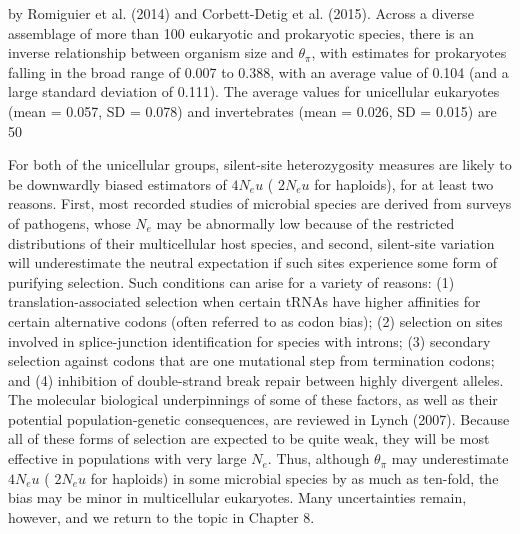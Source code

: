 \documentclass{article}
\begin{document}
by Romiguier et al. (2014) and Corbett-Detig et al. (2015). Across a diverse assemblage of more than 100 eukaryotic and prokaryotic species, there is an inverse relationship between organism size and  $ \theta_{\pi} $, with estimates for prokaryotes falling in the broad range of 0.007 to 0.388, with an average value of 0.104 (and a large standard deviation of 0.111). The average values for unicellular eukaryotes (mean = 0.057, SD = 0.078) and invertebrates (mean = 0.026, SD = 0.015) are 50%

For both of the unicellular groups, silent-site heterozygosity measures are likely to be downwardly biased estimators of  $ 4N_{e}u $ ( $ 2N_{e}u $ for haploids), for at least two reasons. First, most recorded studies of microbial species are derived from surveys of pathogens, whose  $ N_{e} $ may be abnormally low because of the restricted distributions of their multicellular host species, and second, silent-site variation will underestimate the neutral expectation if such sites experience some form of purifying selection. Such conditions can arise for a variety of reasons: (1) translation-associated selection when certain tRNAs have higher affinities for certain alternative codons (often referred to as codon bias); (2) selection on sites involved in splice-junction identification for species with introns; (3) secondary selection against codons that are one mutational step from termination codons; and (4) inhibition of double-strand break repair between highly divergent alleles. The molecular biological underpinnings of some of these factors, as well as their potential population-genetic consequences, are reviewed in Lynch (2007). Because all of these forms of selection are expected to be quite weak, they will be most effective in populations with very large  $ N_{e} $. Thus, although  $ \theta_{\pi} $ may underestimate  $ 4N_{e}u $ ( $ 2N_{e}u $ for haploids) in some microbial species by as much as ten-fold, the bias may be minor in multicellular eukaryotes. Many uncertainties remain, however, and we return to the topic in Chapter 8.
\end{document}
